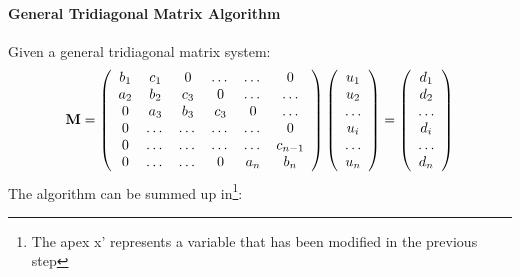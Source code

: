 \documentclass[10pt,a4paper,titlepage]{article}
\begin{document}
\paragraph{General Tridiagonal Matrix Algorithm} Given a general tridiagonal matrix system:
\[
    {\bf M} = \left(\begin{array}{cccccc}
                           b_1& c_1& 0 &\dots   & \dots &0 \\
                           a_2 & b_2 & c_3 &0 &\dots &\dots \\
                           0&a_3 & b_3 & c_3 & 0 & \dots \\
                           0& \dots   & \dots &\dots   &\dots & 0 \\
                           0&\dots   &\dots  &\dots  &\dots& c_{n-1} \\
                           0&\dots &\dots  &0  &a_{n} & b_n \\
                      \end{array} \right)
                       \left(\begin{array}{c}
                           u_1\\
                           u_2\\
                           \dots\\
                           u_i\\
                           \dots\\
                           u_n\\
                      \end{array} \right)
	= \left(\begin{array}{c}
                           d_1\\
                           d_2\\
                           \dots\\
                           d_i\\
                           \dots\\
                           d_n\\
                      \end{array} \right)    
\]   
The algorithm can be summed up in\footnote{The apex x' represents a variable that has been modified in the previous step}:
\end{document}
